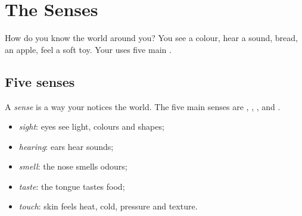 \chapter{The Senses}\label{ch:g1:senses}

How do you know the world around you? You see a colour, hear a
sound,  bread,  an apple, feel a soft toy. Your  uses
five main \emph{}.

\section{Five senses}

\begin{definition}[Sense]\label{def:g1:senses:sense}
A \emph{sense} is a way your  notices the world.
The five main senses are , , ,  and .
\end{definition}


\begin{definition}\label{def:g1:senses:five}
\begin{itemize}
  \item \emph{sight}: eyes see light,
        colours and shapes;
  \item \emph{hearing}: ears hear sounds;
  \item \emph{smell}: the nose smells
        odours;
  \item \emph{taste}: the tongue tastes
        food;
  \item \emph{touch}: skin feels heat,
        cold, pressure and texture.
\end{itemize}
\end{definition}

